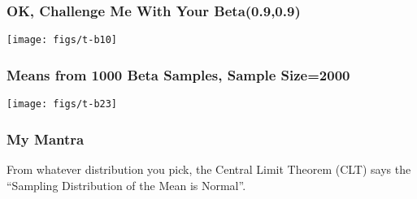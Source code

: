 \documentclass[10pt,english]{beamer}
\begin{document}
\begin{frame}
 \frametitle{OK, Challenge Me With Your Beta(0.9,0.9)}

\texttt{[image: figs/t-b10]}
\end{frame}

\begin{frame}
  \frametitle{Means from 1000 Beta Samples, Sample Size=2000}

\texttt{[image: figs/t-b23]}
\end{frame}



\begin{frame}
 \frametitle{My Mantra}

From whatever distribution you pick, the Central Limit Theorem (CLT)
says the {}``Sampling Distribution of the Mean is Normal''. 

\end{frame}
% 
\end{document}
